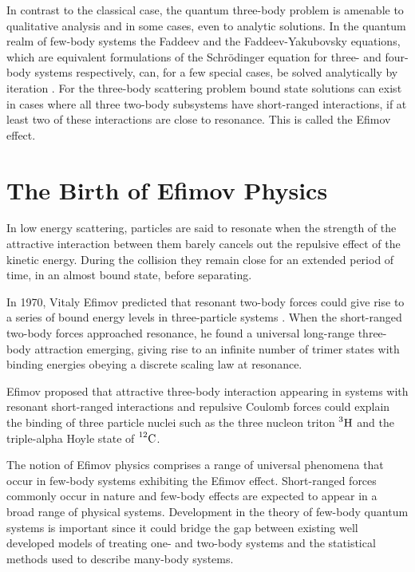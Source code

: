 In contrast to the classical case, the quantum three-body problem is amenable to qualitative analysis \cite{efimov1990qualitative} and in some cases, even to analytic solutions. In the quantum realm of few-body systems the Faddeev and the Faddeev-Yakubovsky equations, which are equivalent formulations of the Schr{\"o}dinger equation for three- and four-body systems respectively, can, for a few special cases, be solved analytically by iteration \cite{Faddeev:1960su, Zubarev:1994}. For the three-body scattering problem bound state solutions can exist in cases where all three two-body subsystems have short-ranged interactions, if at least two of these interactions are close to resonance. This is called the Efimov effect. 

\section{The Birth of Efimov Physics}
In low energy scattering, particles are said to resonate when the strength of the attractive interaction between them barely cancels out the repulsive effect of the kinetic energy. During the collision they remain close for an extended period of time, in an almost bound state, before separating. 

In 1970, Vitaly Efimov predicted that resonant two-body forces could give rise to a series of bound energy levels in three-particle systems \cite{Efimov:1970zz}. When the short-ranged two-body forces approached resonance, he found a universal long-range three-body attraction emerging, giving rise to an infinite number of trimer states with binding energies obeying a discrete scaling law at resonance.  

Efimov proposed that attractive three-body interaction appearing in systems with resonant short-ranged interactions and repulsive Coulomb forces could explain the binding of three particle nuclei such as the three nucleon triton $\prescript{3}{}{\mathrm{H}}$ and the triple-alpha Hoyle state of $\prescript{12}{}{\mathrm{C}}$.

The notion of Efimov physics comprises a range of universal phenomena that occur in few-body systems exhibiting the Efimov effect. Short-ranged forces commonly occur in nature and few-body effects are expected to appear in a broad range of physical systems. Development in the theory of few-body quantum systems is important since it could bridge the gap between existing well developed models of treating one- and two-body systems and the statistical methods used to describe many-body systems.

